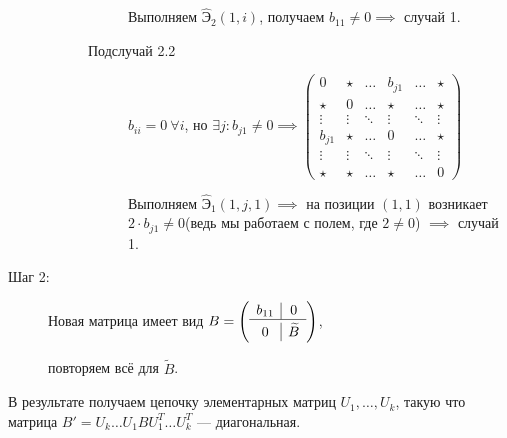 \documentclass[a4paper]{article}
\begin{document}
\begin{colloq}
\begin{description}
\begin{description}
\begin{description}
                        Выполняем $\widehat{\text{Э}}_{2} (1, i)$, получаем $b_{1 1} \neq 0 \implies$ случай 1.

                        \item[Подслучай 2.2]  
                        $b_{i i} = 0 \ \forall i$, но $\exists j \colon b_{j 1} \neq 0 \implies
                        \left(
                            \begin{array}{c|ccccc}
                                0 & \star & \dots & b_{j 1} & \dots & \star \\
                                \hline
                                \star & 0 & \dots & \star & \dots & \star \\
                                \vdots & \vdots & \ddots & \vdots & \ddots & \vdots \\
                                b_{j 1} & \star & \dots & 0 & \dots & \star \\
                                \vdots & \vdots & \ddots & \vdots & \ddots & \vdots \\
                                \star & \star & \dots & \star & \dots & 0
                            \end{array}
                        \right)
                        $

                        Выполняем $\widehat{\text{Э}}_{1} (1, j, 1) \implies$ на позиции $(1,1)$ возникает $2 \cdot b_{j 1} \neq 0$(ведь мы работаем с полем, где $2 \neq 0$) $ \implies$ случай 1.
                    \end{description}  
                \end{description}
                \item[Шаг 2:]
                Новая матрица имеет вид 
                $B = \left(
                        \begin{array}{c|c}
                            b_{1 1} & 0 \\
                            \hline
                            \noalign{\vskip 0.5ex}
                            0 & \widetilde{B}
                        \end{array} 
                    \right)$,

                повторяем всё для $\widetilde{B}$.
            \end{description}


            В результате получаем цепочку элементарных матриц $U_{1}, \dots , U_{k}$, такую что матрица $B' = U_{k} \dots U_{1} B U^{T}_{1} \dots U^{T}_{k}$ --- диагональная.


\end{colloq}
\end{document}
